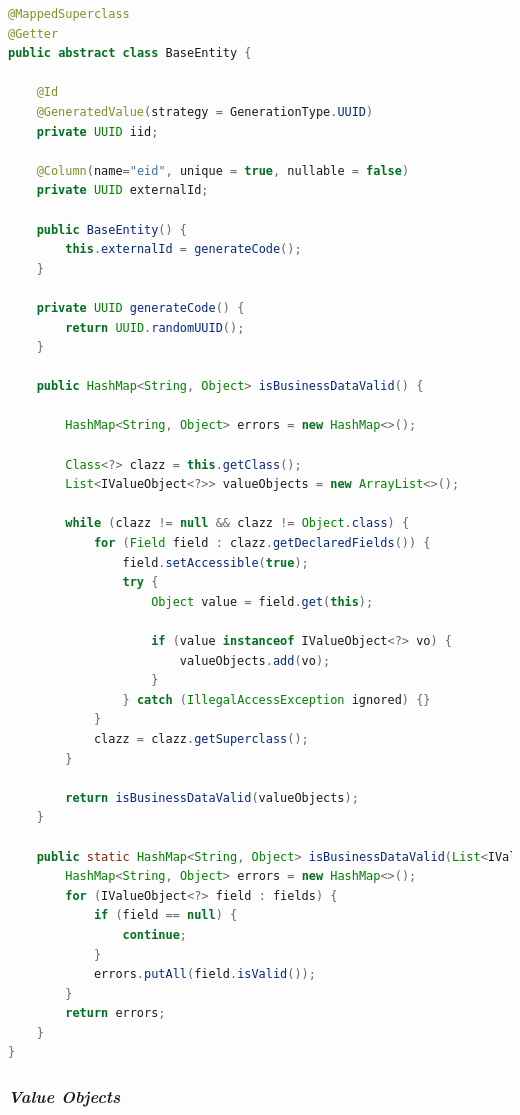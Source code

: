 \begin{lstlisting}[language=Java,caption={Classe \textit{BaseEntity}},label={lst:base-entity}]
@MappedSuperclass
@Getter
public abstract class BaseEntity {

    @Id
    @GeneratedValue(strategy = GenerationType.UUID)
    private UUID iid;

    @Column(name="eid", unique = true, nullable = false)
    private UUID externalId;

    public BaseEntity() {
        this.externalId = generateCode();
    }

    private UUID generateCode() {
        return UUID.randomUUID();
    }

    public HashMap<String, Object> isBusinessDataValid() {

        HashMap<String, Object> errors = new HashMap<>();

        Class<?> clazz = this.getClass();
        List<IValueObject<?>> valueObjects = new ArrayList<>();

        while (clazz != null && clazz != Object.class) {
            for (Field field : clazz.getDeclaredFields()) {
                field.setAccessible(true);
                try {
                    Object value = field.get(this);

                    if (value instanceof IValueObject<?> vo) {
                        valueObjects.add(vo);
                    }
                } catch (IllegalAccessException ignored) {}
            }
            clazz = clazz.getSuperclass();
        }

        return isBusinessDataValid(valueObjects);
    }

    public static HashMap<String, Object> isBusinessDataValid(List<IValueObject<?>> fields) {
        HashMap<String, Object> errors = new HashMap<>();
        for (IValueObject<?> field : fields) {
            if (field == null) {
                continue;
            }
            errors.putAll(field.isValid());
        }
        return errors;
    }
}

\end{lstlisting}












\subsubsection{\textit{Value Objects}}
\label{sec:backend-value-objects}

